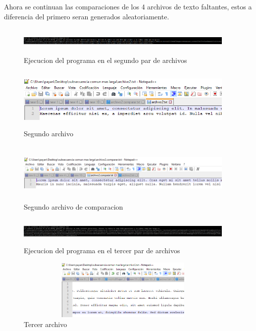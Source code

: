 \documentclass[spanish]{article}
\begin{document}
	Ahora se continuan las comparaciones de los 4 archivos de texto faltantes, estos a diferencia del primero seran generados aleatoriamente.\\
	\begin{figure}[H]
		\centering
		\includegraphics[width=400px,height=50px]{captura4}
		\caption{Ejecucion del programa en el segundo par de archivos}
	\end{figure}
	\begin{figure}[H]
		\centering
		\includegraphics[width=400px,height=110px]{captura5}
		\caption{Segundo archivo}
	\end{figure}
	\begin{figure}[H]
		\centering
		\includegraphics[width=400px,height=110px]{captura6}
		\caption{Segundo archivo de comparacion}
	\end{figure}
	\begin{figure}[H]
		\centering
		\includegraphics[width=400px,height=50px]{captura7}
		\caption{Ejecucion del programa en el tercer par de archivos}
	\end{figure}
	\begin{figure}[H]
		\centering
		\includegraphics[width=400px,height=110px]{captura8}
		\caption{Tercer archivo}
	\end{figure}
\end{document}
